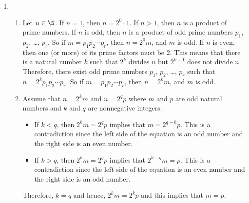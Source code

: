 \begin{enumerate}
\item \begin{enumerate}
\item Let $n \in \N$.  If $n = 1$, then $n = 2^0 \cdot 1$.  If $n > 1$, then $n$ is a product of prime numbers.  If $n$ is odd, then $n$ is a product of odd prime numbers 
$p_1$, $p_2$, \ldots, $p_r$.  So if $m = p_1 p_2 \cdots p_r$, then $n = 2^0 m$, and $m$ is odd.  If $n$ is even, then one (or more) of its prime factors must be 2.  This means that there is a natural number $k$ such that $2^k$ divides $n$ but $2^{k+1}$ does not divide 
$n$.  Therefore, there exist odd prime numbers $p_1$, $p_2$, \ldots, $p_r$ such that 
$n = 2^k p_1 p_2 \cdots p_r$.  So if $m = p_1 p_2 \cdots p_r$, then $n = 2^k m$, and $m$ is odd.

\item Assume that $n = 2^k m$ and $n = 2^q p$ where $m$ and 
$p$ are odd natural numbers and $k$ and $q$ are nonnegative integers.
\begin{itemize}
\item If $k < q$, then $2^k m = 2^q p$ implies that $m = 2^{q -k} p$.  This is a contradiction since the left side of the equation is an odd number and the right side is an even number.

\item If $k > q$, then $2^k m = 2^q p$ implies that $2^{k-q}m = p$.  This is a contradiction since the left side of the equation is an even number and the right side is an odd number.
\end{itemize}
Therefore, $k = q$ and hence, $2^k m = 2^k p$ and this implies that $m = p$.
\end{enumerate}
\end{enumerate}



